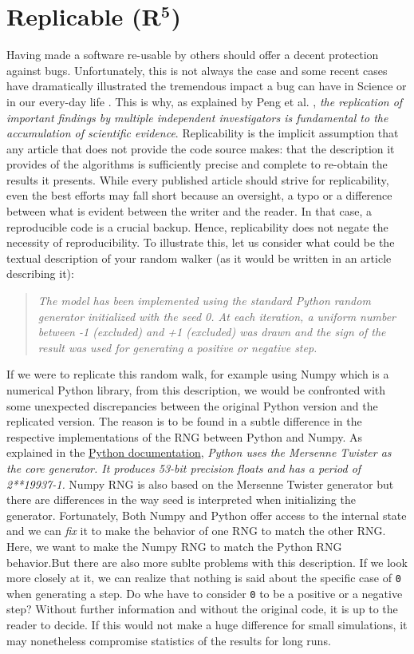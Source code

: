 \documentclass[a4paper,11pt]{article}
\begin{document}
\section*{Replicable (R$^{\mathbf 5}$)}

Having made a software re-usable by others should offer a decent protection
against bugs. Unfortunately, this is not always the case and some recent cases
have dramatically illustrated the tremendous impact a bug can have in Science
\citep{Eklund:2016} or in our every-day life \citep{Durumeric:2014}. This is
why, as explained by Peng et al. \cite{Peng:2006}, {\em the replication of
  important findings by multiple independent investigators is fundamental to
  the accumulation of scientific evidence}. Replicability is the implicit
assumption that any article that does not provide the code source makes: that
the description it provides of the algorithms is sufficiently precise and
complete to re-obtain the results it presents. While every published article
should strive for replicability, even the best efforts may fall short because
an oversight, a typo or a difference between what is evident between the writer
and the reader. In that case, a reproducible code is a crucial backup. Hence,
replicability does not negate the necessity of reproducibility. To illustrate
this, let us consider what could be the textual description of your random
walker (as it would be written in an article describing it):
%
\begin{quotation}
{\em The model has been implemented using the standard Python random generator initialized with the seed 0. At each iteration, a uniform number between -1 (excluded) and +1 (excluded) was drawn and the sign of the result was used for generating a positive or negative step.}
\end{quotation}
%
If we were to replicate this random walk, for example using Numpy which is a
numerical Python library, from this description, we would be confronted with some
unexpected discrepancies between the original Python version and the replicated
version. The reason is to be found in a subtle difference in the respective
implementations of the RNG between Python and Numpy. As explained in the
\href{https://docs.python.org/3.6/library/random.html}{Python documentation},
{\em Python uses the Mersenne Twister as the core generator. It produces
53-bit precision floats and has a period of 2**19937-1.} Numpy RNG is
also based on the Mersenne Twister generator but there are differences in the
way seed is interpreted when initializing the generator. Fortunately, Both
Numpy and Python offer access to the internal state and we can {\em fix} it to
make the behavior of one RNG to match the other RNG. Here, we want to make the
Numpy RNG to match the Python RNG behavior.But there are also more sublte
problems with this description. If we look more closely at it, we can realize
that nothing is said about the specific case of {\tt 0} when generating a step.
Do whe have to consider {\tt 0} to be a positive or a negative step? Without
further information and without the original code, it is up to the reader to
decide. If this would not make a huge difference for small simulations, it
may nonetheless compromise statistics of the results for long runs.\\
\end{document}
